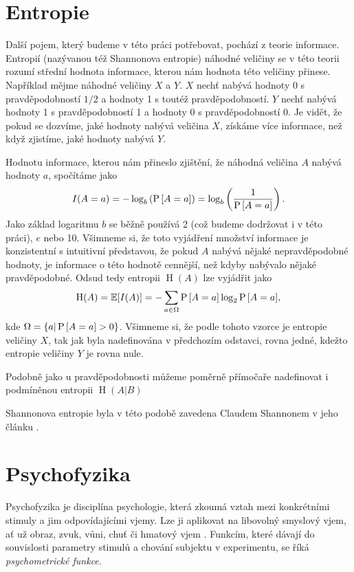 \section{Entropie}

Další pojem, který budeme v této práci potřebovat, pochází z teorie informace.
Entropií (nazývanou též Shannonova entropie) náhodné veličiny se v této teorii
rozumí střední hodnota informace, kterou nám hodnota této veličiny přinese.
Například mějme náhodné veličiny $X$ a $Y$. $X$ nechť nabývá hodnoty 0 s
pravděpodobností $1/2$ a hodnoty 1 s toutéž pravděpodobností. $Y$ nechť nabývá
hodnoty 1 s pravděpodobností 1 a hodnoty 0 s pravděpodobností 0. Je vidět, že
pokud se dozvíme, jaké hodnoty nabývá veličina $X$, získáme více informace, než
když zjistíme, jaké hodnoty nabývá $Y$.  \def\H{\operatorname{H}}

Hodnotu informace, kterou nám přineslo zjištění, že náhodná veličina $A$ nabývá
hodnoty $a$, spočítáme jako $$I(A=a)=-\log_b\left({\P{A=a}}\right)=\log_b\left(\frac1{\P{A=a}}\right).$$ Jako
základ logaritmu $b$ se běžně používá 2 (což budeme dodržovat i v této práci), $e$
nebo 10. Všimneme si, že toto vyjádření množství informace je konzistentní s
intuitivní představou, že pokud $A$ nabývá nějaké nepravděpodobné
hodnoty, je informace o této hodnotě cennější, než kdyby nabývalo nějaké pravděpodobné. Odsud tedy
entropii $\H(A)$ lze vyjádřit jako $$\H(A)=\mathbb{E}[I(A)]=-\displaystyle\sum_{a
\in \Omega}\P{A=a}\log_2{\P{A=a}},$$ kde $\Omega = \{a|\P{A=a} > 0\}$.
Všimneme si, že podle tohoto vzorce je entropie veličiny $X$, tak jak byla
nadefinována v předchozím odstavci, rovna jedné, kdežto  entropie veličiny $Y$
je rovna nule.

Podobně jako u pravděpodobnosti můžeme poměrně přímočaře nadefinovat i   
podmíněnou entropii $\H(A| B)$

Shannonova entropie byla v této podobě zavedena Claudem Shannonem v jeho článku \citeyearpar{Entropie}. 

\section{Psychofyzika}

Psychofyzika je disciplína psychologie, která zkoumá vztah mezi konkrétními
stimuly a jim odpovídajícími vjemy. Lze ji aplikovat na libovolný smyslový
vjem, ať už obraz, zvuk, vůni, chuť či hmatový vjem \citep{psychophysics}.
Funkcím, které dávají do souvislosti parametry stimulů a chování subjektu v
experimentu, se říká {\it psychometrické funkce}. 

